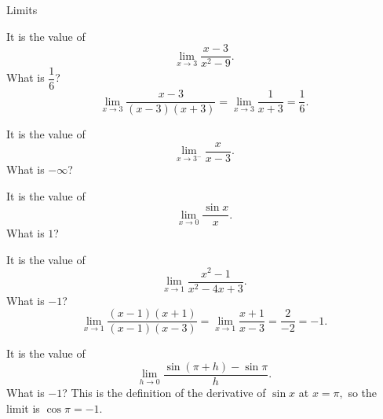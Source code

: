 \documentclass{article}
\begin{document}
\begin{category}{Limits}

  \begin{clue}[say]
    It is the value of
    \[ \lim_{x\to 3} \frac{x-3}{x^2-9}. \]
  \response
    What is $\dfrac{1}{6}$?
  \solution
    \[ \lim_{x\to 3} \frac{x-3}{(x-3)(x+3)} = \lim_{x\to 3} \frac{1}{x+3} = \frac{1}{6}. \]
  \end{clue}

  \begin{clue}[say]
    It is the value of
    \[ \lim_{x\to 3^-} \frac{x}{x-3}. \]
  \response
    What is $-\infty$?
  \end{clue}

  \begin{clue}[say]
    It is the value of
    \[ \lim_{x\to 0} \frac{\sin x}{x}. \]
  \response
    What is $1$?
  \end{clue}

  \begin{clue}[say]
    It is the value of
    \[ \lim_{x\to 1} \frac{x^2-1}{x^2-4x+3}. \]
  \response
    What is $-1$?
  \solution
    \[ \lim_{x\to 1} \frac{(x-1)(x+1)}{(x-1)(x-3)} = \lim_{x\to 1} \frac{x+1}{x-3} = \frac{2}{-2} = -1. \]
  \end{clue}

  \begin{clue}[say]
    It is the value of
    \[ \lim_{h\to 0} \frac{\sin(\pi+h) - \sin \pi}{h}. \]
  \response
    What is $-1$?
  \solution
    This is the definition of the derivative of $\sin x$ at $x = \pi,$ so the
    limit is $\cos \pi = -1.$
  \end{clue}

\end{category}
\end{document}
